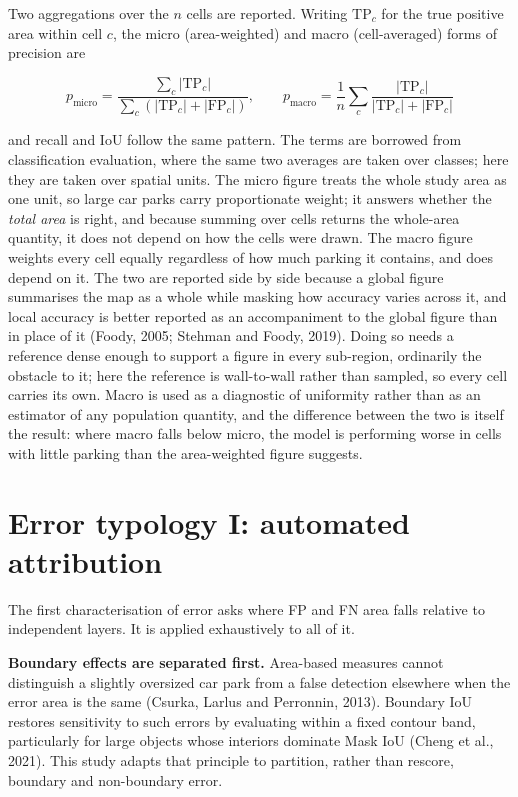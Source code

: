 Two aggregations over the \(n\) cells are reported. Writing \(\mathrm{TP}_c\) for the true positive area within cell \(c\), the micro (area-weighted) and macro (cell-averaged) forms of precision are

\[
p_{\text{micro}} = \frac{\sum_c |\mathrm{TP}_c|}{\sum_c\left(|\mathrm{TP}_c| + |\mathrm{FP}_c|\right)},
\qquad
p_{\text{macro}} = \frac{1}{n}\sum_c \frac{|\mathrm{TP}_c|}{|\mathrm{TP}_c| + |\mathrm{FP}_c|}
\]

and recall and IoU follow the same pattern. The terms are borrowed from classification evaluation, where the same two averages are taken over classes; here they are taken over spatial units. The micro figure treats the whole study area as one unit, so large car parks carry proportionate weight; it answers whether the \emph{total area} is right, and because summing over cells returns the whole-area quantity, it does not depend on how the cells were drawn. The macro figure weights every cell equally regardless of how much parking it contains, and does depend on it. The two are reported side by side because a global figure summarises the map as a whole while masking how accuracy varies across it, and local accuracy is better reported as an accompaniment to the global figure than in place of it (Foody, 2005; Stehman and Foody, 2019). Doing so needs a reference dense enough to support a figure in every sub-region, ordinarily the obstacle to it; here the reference is wall-to-wall rather than
sampled, so every cell carries its own. Macro is used as a diagnostic of uniformity rather than as an estimator of any population quantity, and the difference between the two is itself the result: where macro falls below micro, the model is performing worse in cells with little parking than the area-weighted figure suggests.

\hypertarget{error-typology-i-automated-attribution}{%
\section{Error typology I: automated attribution}\label{error-typology-i-automated-attribution}}

The first characterisation of error asks where FP and FN area falls relative to independent layers. It is applied exhaustively to all of it.

\textbf{Boundary effects are separated first.} Area-based measures cannot distinguish a slightly oversized car park from a false detection elsewhere when the error area is the same (Csurka, Larlus and Perronnin, 2013). Boundary IoU restores sensitivity to such errors by evaluating within a fixed contour band, particularly for large objects whose interiors dominate Mask IoU (Cheng et al., 2021). This study adapts that principle to partition, rather than rescore, boundary and non-boundary error.

